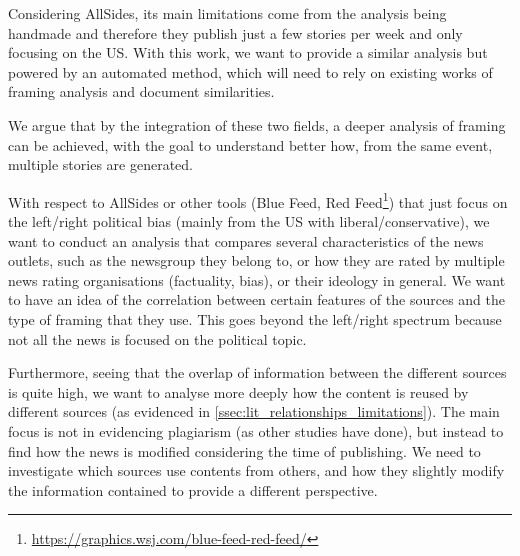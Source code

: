 Considering AllSides, its main limitations come from the analysis being handmade and therefore they publish just a few stories per week and only focusing on the US.
With this work, we want to provide a similar analysis but powered by an automated method, which will need to rely on existing works of framing analysis and document similarities.




We argue that by the integration of these two fields, a deeper analysis of framing can be achieved, with the goal to understand better how, from the same event, multiple stories are generated.


With respect to AllSides or other tools (Blue Feed, Red Feed\footnote{\url{https://graphics.wsj.com/blue-feed-red-feed/}}) that just focus on the left/right political bias (mainly from the US with liberal/conservative), we want to conduct an analysis that compares several characteristics of the news outlets, such as the newsgroup they belong to, or how they are rated by multiple news rating organisations (factuality, bias), or their ideology in general.
We want to have an idea of the correlation between certain features of the sources and the type of framing that they use. This goes beyond the left/right spectrum because not all the news is focused on the political topic.


Furthermore, seeing that the overlap of information between the different sources is quite high, we want to analyse more deeply how the content is reused by different sources (as evidenced in \ref{ssec:lit_relationships_limitations}). The main focus is not in evidencing plagiarism (as other studies have done), but instead to find how the news is modified considering the time of publishing.
We need to investigate which sources use contents from others, and how they slightly modify the information contained to provide a different perspective.

